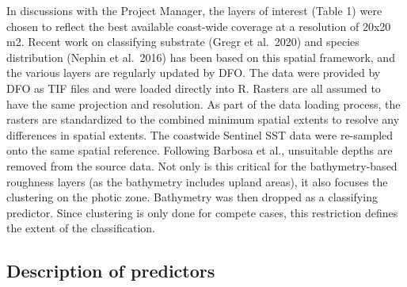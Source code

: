 \documentclass[
  11pt,
]{article}
\begin{document}
In discussions with the Project Manager, the layers of interest (Table
1) were chosen to reflect the best available coast-wide coverage at a
resolution of 20x20 m2. Recent work on classifying substrate (Gregr et
al.~2020) and species distribution (Nephin et al.~2016) has been based
on this spatial framework, and the various layers are regularly updated
by DFO. The data were provided by DFO as TIF files and were loaded
directly into R. Rasters are all assumed to have the same projection and
resolution. As part of the data loading process, the rasters are
standardized to the combined minimum spatial extents to resolve any
differences in spatial extents. The coastwide Sentinel SST data were
re-sampled onto the same spatial reference. Following Barbosa et al.,
unsuitable depths are removed from the source data. Not only is this
critical for the bathymetry-based roughness layers (as the bathymetry
includes upland areas), it also focuses the clustering on the photic
zone. Bathymetry was then dropped as a classifying predictor. Since
clustering is only done for compete cases, this restriction defines the
extent of the classification.

\hypertarget{description-of-predictors}{%
\subsection{Description of predictors}\label{description-of-predictors}}
\end{document}
